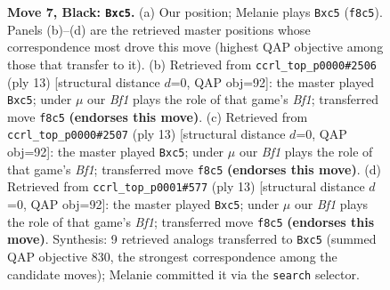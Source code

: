 \documentclass[11pt]{article}
\begin{document}
\begin{figure}[p]
\caption{\textbf{Move 7, Black: \texttt{Bxc5}.} (a) Our position; Melanie plays \texttt{Bxc5} (\texttt{f8c5}). Panels (b)--(d) are the retrieved master positions whose correspondence most drove this move (highest QAP objective among those that transfer to it). (b) Retrieved from \texttt{ccrl\_top\_p0000\#2506} (ply 13) [structural distance $d$=0, QAP obj=92]: the master played \texttt{Bxc5}; under $\mu$ our \emph{Bf1} plays the role of that game's \emph{Bf1}; transferred move \texttt{f8c5} \textbf{(endorses this move)}. (c) Retrieved from \texttt{ccrl\_top\_p0000\#2507} (ply 13) [structural distance $d$=0, QAP obj=92]: the master played \texttt{Bxc5}; under $\mu$ our \emph{Bf1} plays the role of that game's \emph{Bf1}; transferred move \texttt{f8c5} \textbf{(endorses this move)}. (d) Retrieved from \texttt{ccrl\_top\_p0001\#577} (ply 13) [structural distance $d$=0, QAP obj=92]: the master played \texttt{Bxc5}; under $\mu$ our \emph{Bf1} plays the role of that game's \emph{Bf1}; transferred move \texttt{f8c5} \textbf{(endorses this move)}. Synthesis: 9 retrieved analogs transferred to \texttt{Bxc5} (summed QAP objective 830, the strongest correspondence among the candidate moves); Melanie committed it via the \texttt{search} selector.}
\label{fig:thought-m13}
\end{figure}

\clearpage
\end{document}
